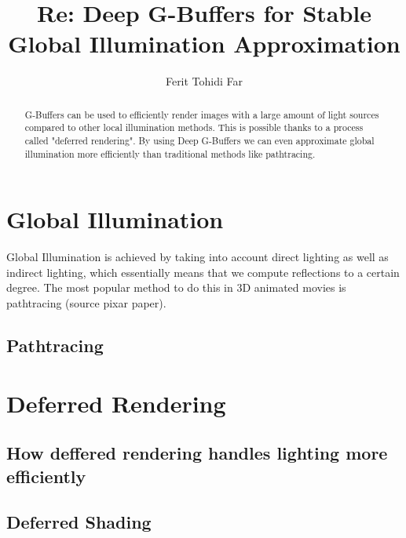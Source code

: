 \documentclass{ACGSeminar}
\begin{document}
\title{Re: Deep G-Buffers for Stable Global Illumination Approximation}

\author{Ferit Tohidi Far}

\maketitle


\begin{abstract}%
G-Buffers can be used to efficiently render images with a large amount of light sources compared to other local illumination methods. This is possible thanks to a 
process called "deferred rendering". By using Deep G-Buffers we can even approximate global illumination more efficiently than traditional methods like pathtracing. 
\end{abstract}

\tableofcontents

\newpage

\label{cha:introduction}
\section{Global Illumination}
	Global Illumination is achieved by taking into account direct lighting as well as indirect lighting, which essentially means that we compute reflections to a
	certain degree. The most popular method to do this in 3D animated movies is pathtracing (source pixar paper).
	\subsection{Pathtracing}
		
\section{Deferred Rendering}
	\subsection{How deffered rendering handles lighting more efficiently}
	\subsection{Deferred Shading}
\end{document}
